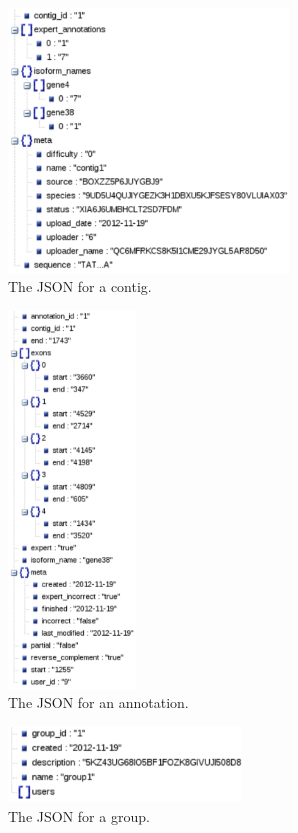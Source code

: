 \documentclass[]{IEEEtran}
\begin{document}
\begin{figure}%
	\includegraphics[height=70mm]{contig.eps}
  \caption{The JSON for a contig.}
  \label{fig:JSON-contig}
\end{figure}%

\begin{figure}%
	\includegraphics[height=100mm]{annotation.eps}
	\caption{The JSON for an annotation.}
	\label{fig:JSON-annotation}
\end{figure}%

\begin{figure}%
	\includegraphics[height=20mm]{group.eps}
	\caption{The JSON for a group.}
	\label{fig:JSON-group}
\end{figure}%
\end{document}
